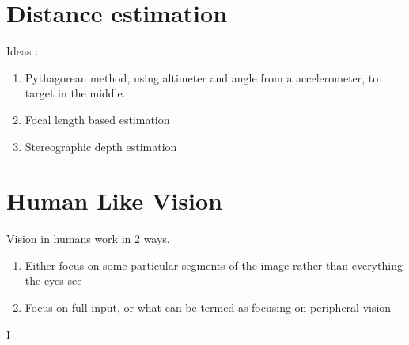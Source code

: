 \documentclass[a4paper, 12pt]{article}
\begin{document}
\chapter{Distance estimation}

Ideas : 
\begin{enumerate}
    \item Pythagorean method, using altimeter and angle from a accelerometer, to target in the middle.
    \item Focal length based estimation
    \item Stereographic depth estimation
\end{enumerate}

\chapter{Human Like Vision}

Vision in humans work in 2 ways.

\begin{enumerate}
    \item Either focus on some particular segments of the image rather than everything the eyes see
    \item Focus on full input, or what can be termed as focusing on peripheral vision
\end{enumerate}


I
\end{document}
